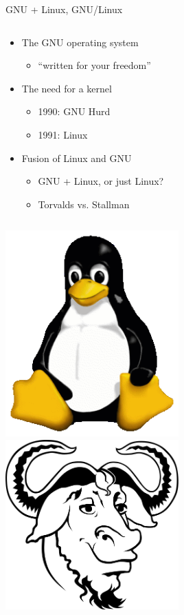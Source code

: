 

\begin{frame}{GNU + Linux, GNU/Linux}
  \begin{column}{0.5\textwidth}
    \begin{itemize}
      \item The GNU operating system
        \begin{itemize}
          \item ``written for your freedom''~\cite[para. 48]{rms2011}
        \end{itemize}
      \item The need for a kernel
        \begin{itemize}
          \item 1990: GNU Hurd
          \item 1991: Linux
        \end{itemize}
      \item Fusion of Linux and GNU
        \begin{itemize}
          \item GNU + Linux, or just Linux?
          \item Torvalds vs. Stallman
        \end{itemize}
    \end{itemize}
  \end{column}
  \begin{column}{0.5\textwidth}\raggedleft
    \includegraphics[width = 0.50\textwidth]{tux.png}
    \includegraphics[width = 0.50\textwidth]{gnu.png}
  \end{column}
\end{frame}

